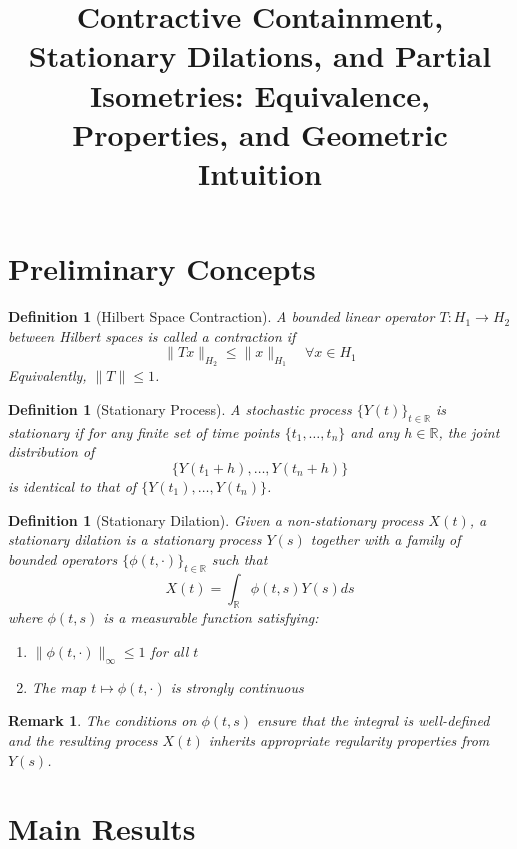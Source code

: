 \documentclass{article}
\newtheorem{definition}[theorem]{Definition}
\newtheorem{remark}[theorem]{Remark}
\begin{document}
\title{Contractive Containment, Stationary Dilations, and Partial Isometries: Equivalence, Properties, and Geometric Intuition}
\author{}
\maketitle

\section{Preliminary Concepts}

\begin{definition}[Hilbert Space Contraction]
A bounded linear operator $T: H_1 \to H_2$ between Hilbert spaces is called a contraction if
\[ \|Tx\|_{H_2} \leq \|x\|_{H_1} \quad \forall x \in H_1 \]
Equivalently, $\|T\| \leq 1$.
\end{definition}

\begin{definition}[Stationary Process]
A stochastic process $\{Y(t)\}_{t \in \mathbb{R}}$ is stationary if for any finite set of time points $\{t_1,\ldots,t_n\}$ and any $h \in \mathbb{R}$, the joint distribution of
\[ \{Y(t_1+h),\ldots,Y(t_n+h)\} \]
is identical to that of $\{Y(t_1),\ldots,Y(t_n)\}$.
\end{definition}

\begin{definition}[Stationary Dilation]
Given a non-stationary process $X(t)$, a stationary dilation is a stationary process $Y(s)$ together with a family of bounded operators $\{\phi(t,\cdot)\}_{t \in \mathbb{R}}$ such that
\[ X(t) = \int_{\mathbb{R}} \phi(t,s)Y(s)ds \]
where $\phi(t,s)$ is a measurable function satisfying:
\begin{enumerate}
    \item $\|\phi(t,\cdot)\|_{\infty} \leq 1$ for all $t$
    \item The map $t \mapsto \phi(t,\cdot)$ is strongly continuous
\end{enumerate}
\end{definition}

\begin{remark}
The conditions on $\phi(t,s)$ ensure that the integral is well-defined and the resulting process $X(t)$ inherits appropriate regularity properties from $Y(s)$.
\end{remark}

\section{Main Results}
\end{document}
